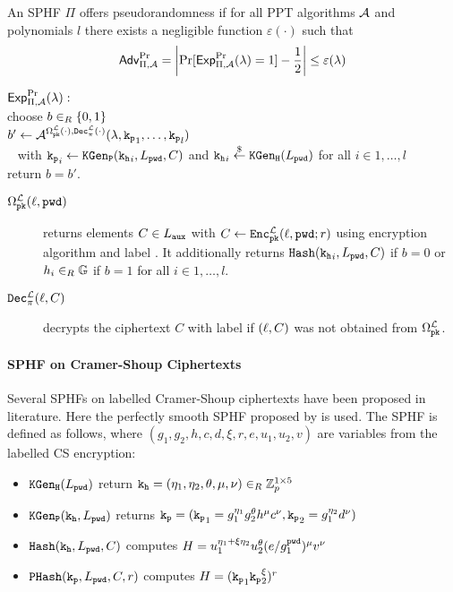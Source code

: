 \begin{definition}[Pseudorandomness]\label{def:prplusc}
An \ac{SPHF} $\Pi$ offers pseudorandomness if for all \ac{PPT} algorithms $\mathcal{A}$ and polynomials $l$ there exists a negligible function $\varepsilon(\cdot)$ such that
\[\mathsf{Adv}_{\Pi,\mathcal{A}}^{\Pr}=\left|\Pr[\mathsf{Exp}_{\Pi,\mathcal{A}}^{\Pr}(\lambda)=1] - \frac12 \right|\leq \varepsilon(\lambda)\]

\noindent
$\mathsf{Exp}_{\Pi,\mathcal{A}}^{\Pr}(\lambda):$ \\
\hspace*{2em} choose $b\in_R\{0,1\}$\\
\hspace*{2em} $b'\gets\mathcal{A}^{\Omega^{\mathcal{L}}_\mathtt{pk}(\cdot),\mathtt{Dec}^\mathcal{L}_\pi(\cdot)}(\lambda,\mathtt{k_p}_1,\dots,\mathtt{k_p}_l)$ \\
\hspace*{4em}~ with $\mathtt{k_p}_i\gets\mathtt{KGen_P}(\mathtt{k_h}_i,L_\mathtt{pwd},C)$ and $\mathtt{k_h}_i\stackrel{\$}{\gets}\mathtt{KGen_H}(L_\mathtt{pwd})$ for all $i\in 1,\dots,l$ \\
\hspace*{2em} return $b=b'$.

\begin{description}
	\item[$\Omega^{\mathcal{L}}_\mathtt{pk}(\ell,\mathtt{pwd})$] returns elements $C\in L_\mathtt{aux}$ with $C\gets\mathtt{Enc}^\mathcal{L}_\mathtt{pk}(\ell,\allowbreak\mathtt{pwd};r)$ using encryption algorithm \cL and label \Label.
    	It additionally returns $\mathtt{Hash}(\mathtt{k_h}_{i},L_\mathtt{pwd},C)$ if $b=0$ or $h_{i}\in_R\mathbb{G}$ if $b=1$ for all $i\in 1,\dots, l$.
	
	\item[$\mathtt{Dec}^\mathcal{L}_\pi(\ell,C)$] decrypts the ciphertext $C$ with label \Label if $(\ell,C)$ was not obtained from $\Omega^\mathcal{L}_\mathtt{pk}$. \eod
\end{description}
\end{definition}

\paragraph{SPHF on Cramer-Shoup Ciphertexts}
Several \acp{SPHF} on labelled Cramer-Shoup ciphertexts have been proposed in literature.
Here the perfectly smooth \ac{SPHF} proposed by \citet{Benhamouda2013} is used.
The \ac{SPHF} is defined as follows, where $(g_1,g_2,h,c,d,\xi,r,e,u_1,u_2,v)$ are variables from the labelled \ac{CS} encryption:
\begin{itemize}
  \item $\mathtt{KGen_H}(L_\mathtt{pwd})$ return $\mathtt{k_h}=(\eta_1,\eta_2,\theta,\mu,\nu)\in_R\mathbb{Z}_p^{1\times 5}$
  \item $\mathtt{KGen_P}(\mathtt{k_h}, L_\mathtt{pwd})$ returns $\mathtt{k_p}=(\mathtt{k_p}_1=g_1^{\eta_1} g_2^{\theta} h^\mu c^\nu, \mathtt{k_p}_2=g_1^{\eta_2} d^{\nu})$
  \item $\mathtt{Hash}(\mathtt{k_h}, L_\mathtt{pwd}, C)$ computes $H=u_1^{\eta_1+\xi\eta_2} u_2^{\theta} (e/g_1^{\mathtt{pwd}})^\mu v^\nu$
  \item $\mathtt{PHash}(\mathtt{k_p}, L_\mathtt{pwd}, C, r)$ computes $H=(\mathtt{k_p}_1 \mathtt{k_p}_2^\xi)^r$
\end{itemize}

